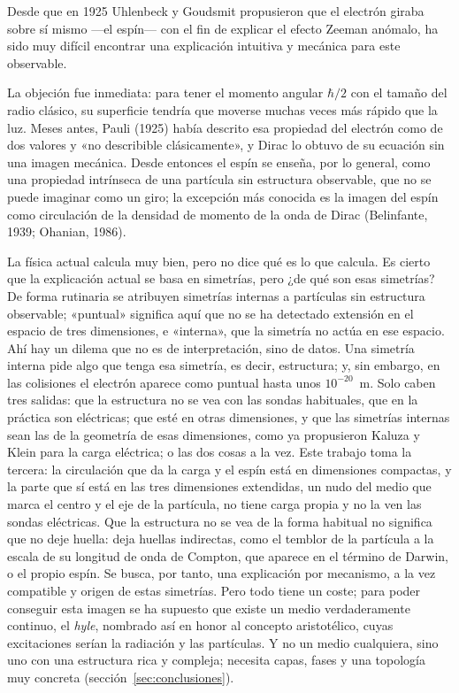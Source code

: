\documentclass[11pt,a4paper]{article}
\begin{document}
Desde que en 1925 Uhlenbeck y Goudsmit propusieron que el electrón giraba sobre sí mismo ---el espín--- con el fin de explicar el efecto Zeeman anómalo, ha sido muy difícil encontrar una explicación intuitiva y mecánica para este observable.

La objeción fue inmediata: para tener el momento angular $\hbar/2$ con el tamaño del radio clásico, su superficie tendría que moverse muchas veces más rápido que la luz. Meses antes, Pauli (1925) había descrito esa propiedad del electrón como de dos valores y «no describible clásicamente», y Dirac lo obtuvo de su ecuación sin una imagen mecánica. Desde entonces el espín se enseña, por lo general, como una propiedad intrínseca de una partícula sin estructura observable, que no se puede imaginar como un giro; la excepción más conocida es la imagen del espín como circulación de la densidad de momento de la onda de Dirac (Belinfante, 1939; Ohanian, 1986).

La física actual calcula muy bien, pero no dice qué es lo que calcula. Es cierto que la explicación actual se basa en simetrías, pero ¿de qué son esas simetrías? De forma rutinaria se atribuyen simetrías internas a partículas sin estructura observable; «puntual» significa aquí que no se ha detectado extensión en el espacio de tres dimensiones, e «interna», que la simetría no actúa en ese espacio. Ahí hay un dilema que no es de interpretación, sino de datos. Una simetría interna pide algo que tenga esa simetría, es decir, estructura; y, sin embargo, en las colisiones el electrón aparece como puntual hasta unos $10^{-20}$~m. Solo caben tres salidas: que la estructura no se vea con las sondas habituales, que en la práctica son eléctricas; que esté en otras dimensiones, y que las simetrías internas sean las de la geometría de esas dimensiones, como ya propusieron Kaluza y Klein para la carga eléctrica; o las dos cosas a la vez. Este trabajo toma la tercera: la circulación que da la carga y el espín está en dimensiones compactas, y la parte que sí está en las tres dimensiones extendidas, un nudo del medio que marca el centro y el eje de la partícula, no tiene carga propia y no la ven las sondas eléctricas. Que la estructura no se vea de la forma habitual no significa que no deje huella: deja huellas indirectas, como el temblor de la partícula a la escala de su longitud de onda de Compton, que aparece en el término de Darwin, o el propio espín. Se busca, por tanto, una explicación por mecanismo, a la vez compatible y origen de estas simetrías. Pero todo tiene un coste; para poder conseguir esta imagen se ha supuesto que existe un medio verdaderamente continuo, el \emph{hyle}, nombrado así en honor al concepto aristotélico, cuyas excitaciones serían la radiación y las partículas. Y no un medio cualquiera, sino uno con una estructura rica y compleja; necesita capas, fases y una topología muy concreta (sección~\ref{sec:conclusiones}).
\end{document}
